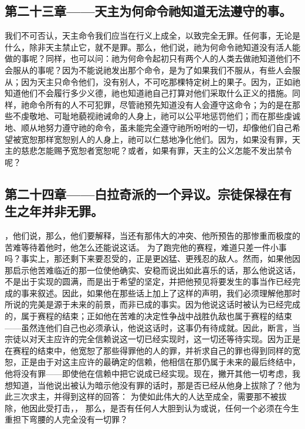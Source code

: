 
\subsection{第二十三章——天主为何命令祂知道无法遵守的事。}

我们不可否认，天主命令我们应当在行义上成全，以致完全无罪。任何事，无论是什么，除非天主禁止它，就不是罪。那么，他们说，祂为何命令祂知道没有活人能做的事呢？同样，也可以问：祂为何命令起初只有两个人的人类去做祂知道他们不会服从的事呢？因为不能说祂发出那个命令，是为了如果我们不服从，有些人会服从；因为天主只命令他们，没有别人，不可吃那棵特定树上的果子。因为，正如祂知道他们不会履行多少义德，祂也知道祂自己打算对他们采取什么正义的措施。同样，祂命令所有的人不可犯罪，尽管祂预先知道没有人会遵守这命令；为的是在那些不虔敬地、可耻地藐视祂诫命的人身上，祂可以公平地惩罚他们；而在那些虔诚地、顺从地努力遵守祂的命令，虽未能完全遵守祂所吩咐的一切，却像他们自己希望被宽恕那样宽恕别人的人身上，祂可以仁慈地净化他们。因为，如果没有罪，天主的慈悲怎能赐予宽恕者宽恕呢？或者，如果有罪，天主的公义怎能不发出禁令呢？\par


\subsection{第二十四章——白拉奇派的一个异议。宗徒保禄在有生之年并非无罪。}

，他们说，那么，他们要解释，当还有那伟大的冲突、他所预告的那惨重而极度的苦难等待着他时，他怎么还能说这话。 为了跑完他的赛程，难道只差一件小事吗？事实上，那还剩下来要忍受的，正是更凶猛、更残忍的敌人。然而，如果他因那启示他苦难临近的那一位使他确实、安稳而说出如此喜乐的话，那么他说这话，不是出于实现的圆满，而是出于希望的坚定，并把他预见将要发生的事当作已经完成的事来叙述。因此，如果他在那些话上加上了这样的声明，我们必须理解他那时所说的完美是源于未来的前景，而非已成的事实。因为他说这话时被认为已经完成的，属于赛程的结束；正如他在苦难的决定性争战中战胜仇敌也属于赛程的结束——虽然连他们自己也必须承认，他说这话时，这事仍有待成就。因此，断言，当宗徒以对天主应许的完全信赖说这一切已经实现时，这一切还等待实现。因为正是在赛程的结束中，他宽恕了那些得罪他的人的罪，并祈求自己的罪也得到同样的宽恕，正是由于对这主应许的最确定的信赖，他相信在那仍属于未来的最后终结中，他将没有罪——即使他在信赖中把它说成已经实现。现在，撇开其他一切考虑，我想知道，当他说出被认为暗示他没有罪的话时，那是否已经从他身上拔除了？他为此三次求主，并得到这样的回答： 为使如此伟大的人达至成全，需要那不被拔除，他因此受打击，， 那么，是否有任何人大胆到认为或说，任何一个必须在今生重担下弯腰的人完全没有一切罪？\par

